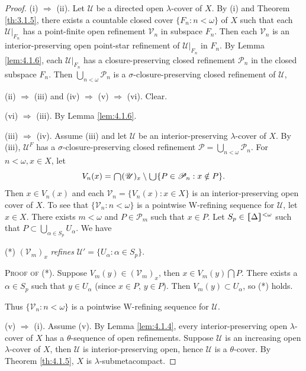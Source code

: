 \documentclass[main.tex]{subfiles}
\begin{document}
\begin{proof} 
(i) $\Rightarrow$ (ii). Let $\mathscr{U}$ be a directed open $\lambda$-cover of $X$.
By (i) and Theorem \ref{th:3.1.5}, there exists a countable closed cover $\{F_n: n < \omega\}$ of $X$ 
such that each $\mathscr{U}|_{F_n}$ has a point-finite open refinement $\mathscr{V}_n$ in subspace $F_n$.
Then each $\mathscr{V}_n$ is an interior-preserving open point-star refinement of $\mathscr{U}|_{F_n}$
in $F_n$.
By Lemma \ref{lem:4.1.6}, each $\mathscr{U}|_{F_n}$ has a closure-preserving closed refinement 
$\mathscr{P}_n$ in the closed subspace $F_n$.
Then $\bigcup_{n <\omega}\mathscr{P}_n$ is a $\sigma$-closure-preserving closed refinement of 
$\mathscr{U}$,

(ii) $\Rightarrow$ (iii) and (iv) $\Rightarrow$ (v) $\Rightarrow$  (vi). Clear.

(vi) $\Rightarrow$  (iii). By Lemma \ref{lem:4.1.6}.

(iii) $\Rightarrow$ (iv). Assume (iii) and let $\mathscr{U}$ be an interior-preserving 
$\lambda$-cover of $X$. By (iii), $\mathscr{U}^F$ has a $\sigma$-closure-preserving closed
refinement $\mathscr{P} = \bigcup_{n<\omega}\mathscr{P}_n$. For  $n<\omega, x\in X$, let
$$V_n(x)= \raisebox{-2pt}{\scalebox{1.5}{$\cap$}} (\mathscr{U})_x \setminus \raisebox{-2pt}{\scalebox{1.5}{$\cup$}}\{P\in\mathscr{P}_n: x\notin P\}.$$
\noindent Then $x\in V_n(x)$ and each $\mathscr{V}_n = \{V_n(x): x \in X\}$ is an 
interior-preserving open cover of $X$. To see that 
$\{\mathscr{V}_n: n < \omega\}$ is a pointwise W-refining sequence for 
$\mathscr{U}$, let $x \in X$.
There exists $m < \omega$ and $P \in \mathscr{P}_m$ such that $x\in P$. 
Let $S_p\in \hstretch{1.8}{[}\Delta\hstretch{1.8}{]}^{<\omega}$ such that $P \subset \bigcup_{\alpha \in S_p} U_\alpha$. 
We have 

(*) $(\mathscr{V}_m)_x$ \textit{refines} $\mathscr{U}' = \{U_\alpha: \alpha \in S_p\}$.

\noindent\textsc{Proof of (*)}. Suppose $V_m(y)\in (\mathscr{V}_m)_x$, then $x \in V_m(y)\bigcap P$.
There exists a $\alpha \in S_p$ such that $y \in U_\alpha$ (since $x \in P$, $y \in P$).
Then $V_m(y) \subset U_\alpha$, so (*) holds. 

Thus $\{\mathscr{V}_n: n < \omega\}$ is 
a pointwise W-refining sequence for $\mathscr{U}$.

(v)  $\Rightarrow$  (i). Assume (v). By Lemma \ref{lem:4.1.4}, every interior-preserving 
open $\lambda$-cover of $X$ has a $\theta$-sequence of open refinements. 
Suppose $\mathscr{U}$ is an increasing open $\lambda$-cover of $X$, then 
$\mathscr{U}$ is interior-preserving open, 
hence $\mathscr{U}$ is a $\theta$-cover. By Theorem \ref{th:4.1.5}, $X$ is $\lambda$-submetacompact.
\end{proof}
\end{document}
